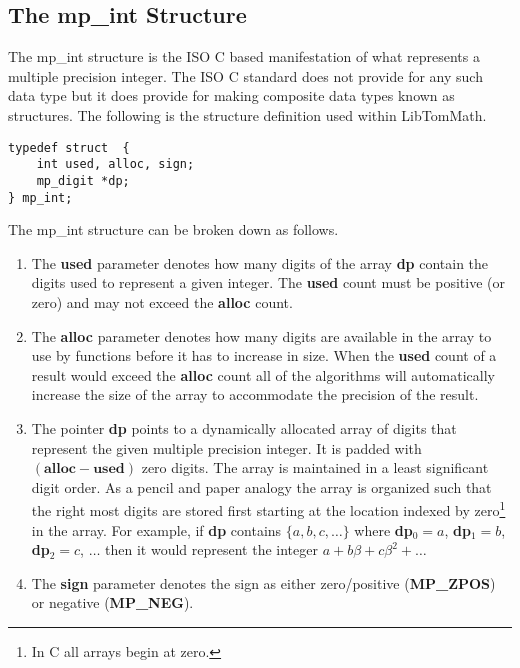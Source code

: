 \documentclass[b5paper]{book}
\begin{document}
\subsection{The mp\_int Structure}
\label{sec:MPINT}
The mp\_int structure is the ISO C based manifestation of what represents a multiple precision integer.  The ISO C standard does not provide for 
any such data type but it does provide for making composite data types known as structures.  The following is the structure definition 
used within LibTomMath.

\begin{verbatim}
typedef struct  {
    int used, alloc, sign;
    mp_digit *dp;
} mp_int;
\end{verbatim}

The mp\_int structure can be broken down as follows.

\begin{enumerate}
\item The \textbf{used} parameter denotes how many digits of the array \textbf{dp} contain the digits used to represent
a given integer.  The \textbf{used} count must be positive (or zero) and may not exceed the \textbf{alloc} count.  

\item The \textbf{alloc} parameter denotes how 
many digits are available in the array to use by functions before it has to increase in size.  When the \textbf{used} count 
of a result would exceed the \textbf{alloc} count all of the algorithms will automatically increase the size of the 
array to accommodate the precision of the result.  

\item The pointer \textbf{dp} points to a dynamically allocated array of digits that represent the given multiple 
precision integer.  It is padded with $(\textbf{alloc} - \textbf{used})$ zero digits.  The array is maintained in a least 
significant digit order.  As a pencil and paper analogy the array is organized such that the right most digits are stored
first starting at the location indexed by zero\footnote{In C all arrays begin at zero.} in the array.  For example, 
if \textbf{dp} contains $\lbrace a, b, c, \ldots \rbrace$ where \textbf{dp}$_0 = a$, \textbf{dp}$_1 = b$, \textbf{dp}$_2 = c$, $\ldots$ then 
it would represent the integer $a + b\beta + c\beta^2 + \ldots$  

 
\item The \textbf{sign} parameter denotes the sign as either zero/positive (\textbf{MP\_ZPOS}) or negative (\textbf{MP\_NEG}).  
\end{enumerate}
\end{document}
